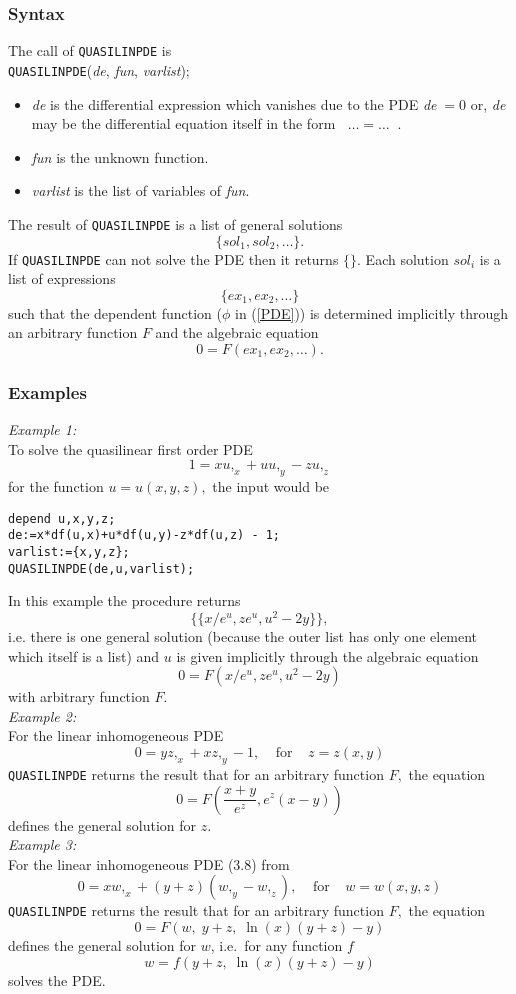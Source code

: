 \subsubsection{Syntax}
The call of \texttt{QUASILINPDE} is \\
\texttt{QUASILINPDE}(\textit{de}, \textit{fun}, \textit{varlist});
\begin{itemize}
\item
\textit{de} is the differential expression which vanishes due to the PDE
\textit{de}$\; = 0$ or, \textit{de} may be the differential equation itself in the
form $\;\;\ldots = \ldots\;\;$.
\item
\textit{fun} is the unknown function.
\item
\textit{varlist} is the list of variables of \textit{fun}.
\end{itemize}
The result of \texttt{QUASILINPDE} is a list of general solutions
\[      \{\textit{sol}_1, \textit{sol}_2, \ldots \}.  \]
If \texttt{QUASILINPDE} can not solve the PDE then it returns $\{\}$.
Each solution $\textit{sol}_i$ is a list of expressions
\[      \{\textit{ex}_1, \textit{ex}_2, \ldots \}  \]
such that the dependent function ($\phi$ in (\ref{PDE})) is determined
implicitly through an arbitrary function $F$ and the algebraic
equation \[ 0 = F(\textit{ex}_1, \textit{ex}_2, \ldots). \]
\subsubsection{Examples}
{\em Example 1:}\\
To solve the quasilinear first order PDE \[1 = xu,_x + uu,_y - zu,_z\]
for the function $u = u(x,y,z),$ the input would be
\small \begin{verbatim}
depend u,x,y,z;
de:=x*df(u,x)+u*df(u,y)-z*df(u,z) - 1;
varlist:={x,y,z};
QUASILINPDE(de,u,varlist);
\end{verbatim} \normalsize
In this example the procedure returns
\[\{ \{ x/e^u, ze^u, u^2 - 2y \} \},\] 
i.e. there is one general solution (because the outer list has only one
element which itself is a list) and $u$ is given implicitly through 
the algebraic equation
\[ 0 = F(x/e^u, ze^u, u^2 - 2y)\] 
with arbitrary function $F.$ \\
{\em Example 2:}\\
For the linear inhomogeneous PDE
\[ 0 = y z,_x + x z,_y - 1, \;\;\;\;\mbox{for}\;\;\;\;z=z(x,y)\]
\texttt{QUASILINPDE} returns the result that for an arbitrary function $F,$ the
equation
\[ 0 = F\left(\frac{x+y}{e^z},e^z(x-y)\right) \]
defines the general solution for $z$. \\
{\em Example 3:}\\
For the linear inhomogeneous PDE (3.8) from \cite{Kamke:Vol2}
\[ 0 = x w,_x + (y+z)(w,_y - w,_z), \;\;\;\;\mbox{for}\;\;\;\;w=w(x,y,z)\]
\texttt{QUASILINPDE} returns the result 
that for an arbitrary function $F,$ the equation
\[ 0 = F\left(w, \;y+z, \;\ln(x)(y+z)-y\right) \]
defines the general solution for $w$, i.e.\ for any function $f$
\[ w = f\left(y+z, \;\ln(x)(y+z)-y\right) \]
solves the PDE.
